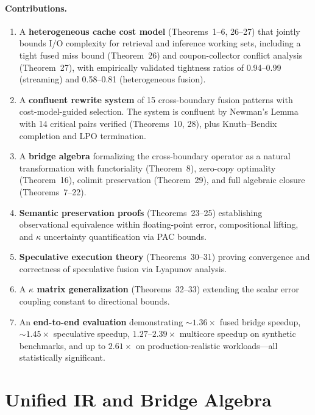\documentclass{article}
\theoremstyle{definition}
\theoremstyle{remark}
\begin{document}
\paragraph{Contributions.}
\begin{enumerate}[leftmargin=*,nosep]
  \item A \textbf{heterogeneous cache cost model} (Theorems~1--6, 26--27) that jointly bounds I/O complexity for retrieval and inference working sets, including a tight fused miss bound (Theorem~26) and coupon-collector conflict analysis (Theorem~27), with empirically validated tightness ratios of 0.94--0.99 (streaming) and 0.58--0.81 (heterogeneous fusion).
  \item A \textbf{confluent rewrite system} of 15 cross-boundary fusion patterns with cost-model-guided selection. The system is confluent by Newman's Lemma with 14 critical pairs verified (Theorems~10, 28), plus Knuth--Bendix completion and LPO termination.
  \item A \textbf{bridge algebra} formalizing the cross-boundary operator as a natural transformation with functoriality (Theorem~8), zero-copy optimality (Theorem~16), colimit preservation (Theorem~29), and full algebraic closure (Theorems~7--22).
  \item \textbf{Semantic preservation proofs} (Theorems~23--25) establishing observational equivalence within floating-point error, compositional lifting, and $\kappa$ uncertainty quantification via PAC bounds.
  \item \textbf{Speculative execution theory} (Theorems~30--31) proving convergence and correctness of speculative fusion via Lyapunov analysis.
  \item A \textbf{$\kappa$ matrix generalization} (Theorems~32--33) extending the scalar error coupling constant to directional bounds.
  \item An \textbf{end-to-end evaluation} demonstrating ${\sim}1.36\times$ fused bridge speedup, ${\sim}1.45\times$ speculative speedup, $1.27$--$2.39\times$ multicore speedup on synthetic benchmarks, and up to $2.61\times$ on production-realistic workloads---all statistically significant.
\end{enumerate}


\section{Unified IR and Bridge Algebra}\label{sec:ir}
\end{document}
